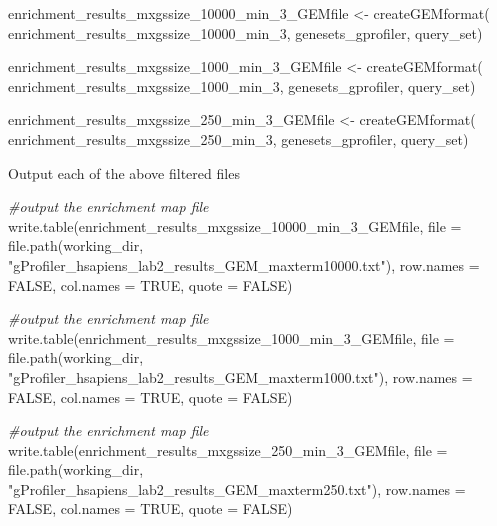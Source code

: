 \documentclass[
]{book}
\newenvironment{Shaded}{\begin{snugshade}}{\end{snugshade}}
\newcommand{\AttributeTok}[1]{\textcolor[rgb]{0.77,0.63,0.00}{#1}}
\newcommand{\CommentTok}[1]{\textcolor[rgb]{0.56,0.35,0.01}{\textit{#1}}}
\newcommand{\ConstantTok}[1]{\textcolor[rgb]{0.00,0.00,0.00}{#1}}
\newcommand{\FunctionTok}[1]{\textcolor[rgb]{0.00,0.00,0.00}{#1}}
\newcommand{\NormalTok}[1]{#1}
\newcommand{\OtherTok}[1]{\textcolor[rgb]{0.56,0.35,0.01}{#1}}
\newcommand{\StringTok}[1]{\textcolor[rgb]{0.31,0.60,0.02}{#1}}
\begin{document}
\begin{Shaded}
\begin{Highlighting}[]
\NormalTok{enrichment\_results\_mxgssize\_10000\_min\_3\_GEMfile }\OtherTok{\textless{}{-}} \FunctionTok{createGEMformat}\NormalTok{(}
\NormalTok{  enrichment\_results\_mxgssize\_10000\_min\_3, genesets\_gprofiler, query\_set)}

\NormalTok{enrichment\_results\_mxgssize\_1000\_min\_3\_GEMfile }\OtherTok{\textless{}{-}} \FunctionTok{createGEMformat}\NormalTok{(}
\NormalTok{  enrichment\_results\_mxgssize\_1000\_min\_3, genesets\_gprofiler, query\_set)}

\NormalTok{enrichment\_results\_mxgssize\_250\_min\_3\_GEMfile }\OtherTok{\textless{}{-}} \FunctionTok{createGEMformat}\NormalTok{(}
\NormalTok{  enrichment\_results\_mxgssize\_250\_min\_3, genesets\_gprofiler, query\_set)}
\end{Highlighting}
\end{Shaded}

Output each of the above filtered files

\begin{Shaded}
\begin{Highlighting}[]
\CommentTok{\#output the enrichment map file}
\FunctionTok{write.table}\NormalTok{(enrichment\_results\_mxgssize\_10000\_min\_3\_GEMfile, }
            \AttributeTok{file =} \FunctionTok{file.path}\NormalTok{(working\_dir, }
                \StringTok{"gProfiler\_hsapiens\_lab2\_results\_GEM\_maxterm10000.txt"}\NormalTok{),}
            \AttributeTok{row.names =} \ConstantTok{FALSE}\NormalTok{, }
            \AttributeTok{col.names =} \ConstantTok{TRUE}\NormalTok{,}
            \AttributeTok{quote =} \ConstantTok{FALSE}\NormalTok{)}

\CommentTok{\#output the enrichment map file}
\FunctionTok{write.table}\NormalTok{(enrichment\_results\_mxgssize\_1000\_min\_3\_GEMfile, }
            \AttributeTok{file =} \FunctionTok{file.path}\NormalTok{(working\_dir, }
                \StringTok{"gProfiler\_hsapiens\_lab2\_results\_GEM\_maxterm1000.txt"}\NormalTok{),}
            \AttributeTok{row.names =} \ConstantTok{FALSE}\NormalTok{, }
            \AttributeTok{col.names =} \ConstantTok{TRUE}\NormalTok{,}
            \AttributeTok{quote =} \ConstantTok{FALSE}\NormalTok{)}

\CommentTok{\#output the enrichment map file}
\FunctionTok{write.table}\NormalTok{(enrichment\_results\_mxgssize\_250\_min\_3\_GEMfile, }
            \AttributeTok{file =} \FunctionTok{file.path}\NormalTok{(working\_dir, }
                \StringTok{"gProfiler\_hsapiens\_lab2\_results\_GEM\_maxterm250.txt"}\NormalTok{),}
            \AttributeTok{row.names =} \ConstantTok{FALSE}\NormalTok{, }
            \AttributeTok{col.names =} \ConstantTok{TRUE}\NormalTok{,}
            \AttributeTok{quote =} \ConstantTok{FALSE}\NormalTok{)}
\end{Highlighting}
\end{Shaded}
\end{document}
